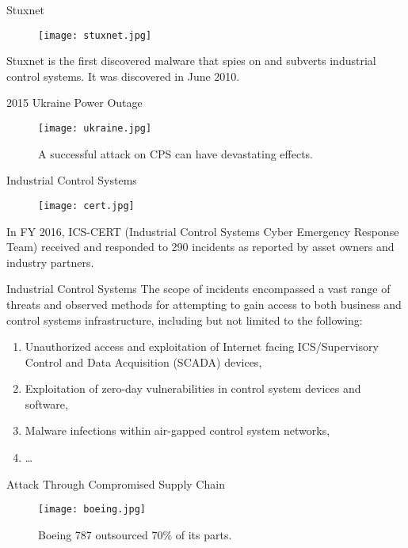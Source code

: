 \documentclass[10pt]{beamer}
\begin{document}
\begin{frame}{Stuxnet}
  \begin{figure}[ht]
    \centering
    \texttt{[image: stuxnet.jpg]}
  \end{figure}
  Stuxnet is the first discovered malware that spies on and subverts industrial control systems. It was discovered in June 2010. 
\end{frame}

\begin{frame}{2015 Ukraine Power Outage}
  \begin{figure}[<+htpb+>]
    \begin{center}
      \texttt{[image: ukraine.jpg]}
      \caption{A successful attack on CPS can have devastating effects.}
    \end{center}
  \end{figure}
\end{frame}

\begin{frame}{Industrial Control Systems}
  \begin{figure}[ht]
    \centering
    \texttt{[image: cert.jpg]}
  \end{figure}
  In FY 2016, ICS-CERT (Industrial Control Systems Cyber Emergency Response Team) received and responded to 290 incidents as reported by asset owners and industry partners.
\end{frame}

\begin{frame}{Industrial Control Systems}
  The scope of incidents encompassed a vast range of threats and observed methods for attempting to gain access to both business and control systems infrastructure, including but not limited to the following:
  \begin{enumerate}
    \item  Unauthorized access and exploitation of Internet facing ICS/Supervisory Control and Data Acquisition (SCADA) devices,
    \item  Exploitation of zero-day vulnerabilities in control system devices and software, 
    \item  Malware infections within air-gapped control system networks,
    \item \dots
  \end{enumerate}
\end{frame}

\begin{frame}{Attack Through Compromised Supply Chain}
  \begin{figure}[ht]
    \centering
    \texttt{[image: boeing.jpg]}
    \caption{Boeing 787 outsourced 70\% of its parts.}
  \end{figure}
\end{frame}
\end{document}
